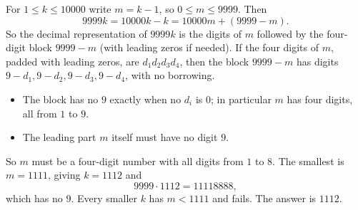 For $1\le k\le10000$ write $m=k-1$, so $0\le m\le9999$. Then
\[
9999k=10000k-k=10000m+(9999-m).
\]
So the decimal representation of $9999k$ is the digits of $m$ followed by the four-digit block $9999-m$ (with leading zeros if needed). If the four digits of $m$, padded with leading zeros, are $d_1d_2d_3d_4$, then the block $9999-m$ has digits $9-d_1,9-d_2,9-d_3,9-d_4$, with no borrowing.
\begin{itemize}
\item The block has no $9$ exactly when no $d_i$ is $0$; in particular $m$ has four digits, all from $1$ to $9$.
\item The leading part $m$ itself must have no digit $9$.
\end{itemize}
So $m$ must be a four-digit number with all digits from $1$ to $8$. The smallest is $m=1111$, giving $k=1112$ and
\[
9999\cdot1112=11118888 ,
\]
which has no $9$. Every smaller $k$ has $m<1111$ and fails. The answer is $\boxed{1112}$.
